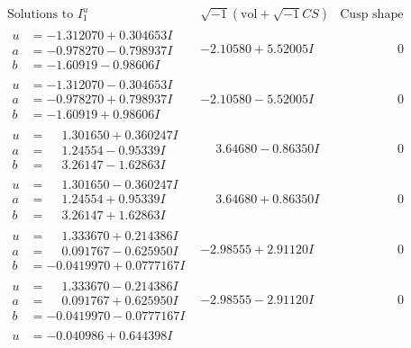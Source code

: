 \documentclass[1p]{elsarticle_modified}
\theoremstyle{definition}
\newcommand{\I}{\sqrt{-1}}
\begin{document}
$$\begin{array}{c|c|c}
\text{Solutions to }I^u_{1}& \I (\text{vol} + \sqrt{-1}CS) & \text{Cusp shape}\\
 \hline 
\begin{aligned}
u &= -1.312070 + 0.304653 I \\
a &= -0.978270 - 0.798937 I \\
b &= -1.60919 - 0.98606 I\end{aligned}
 & -2.10580 + 5.52005 I & \phantom{-0.000000 } 0 \\ \hline\begin{aligned}
u &= -1.312070 - 0.304653 I \\
a &= -0.978270 + 0.798937 I \\
b &= -1.60919 + 0.98606 I\end{aligned}
 & -2.10580 - 5.52005 I & \phantom{-0.000000 } 0 \\ \hline\begin{aligned}
u &= \phantom{-}1.301650 + 0.360247 I \\
a &= \phantom{-}1.24554 - 0.95339 I \\
b &= \phantom{-}3.26147 - 1.62863 I\end{aligned}
 & \phantom{-}3.64680 - 0.86350 I & \phantom{-0.000000 } 0 \\ \hline\begin{aligned}
u &= \phantom{-}1.301650 - 0.360247 I \\
a &= \phantom{-}1.24554 + 0.95339 I \\
b &= \phantom{-}3.26147 + 1.62863 I\end{aligned}
 & \phantom{-}3.64680 + 0.86350 I & \phantom{-0.000000 } 0 \\ \hline\begin{aligned}
u &= \phantom{-}1.333670 + 0.214386 I \\
a &= \phantom{-}0.091767 - 0.625950 I \\
b &= -0.0419970 + 0.0777167 I\end{aligned}
 & -2.98555 + 2.91120 I & \phantom{-0.000000 } 0 \\ \hline\begin{aligned}
u &= \phantom{-}1.333670 - 0.214386 I \\
a &= \phantom{-}0.091767 + 0.625950 I \\
b &= -0.0419970 - 0.0777167 I\end{aligned}
 & -2.98555 - 2.91120 I & \phantom{-0.000000 } 0 \\ \hline\begin{aligned}
u &= -0.040986 + 0.644398 I \\

\end{aligned}
\end{array}$$
\end{document}
